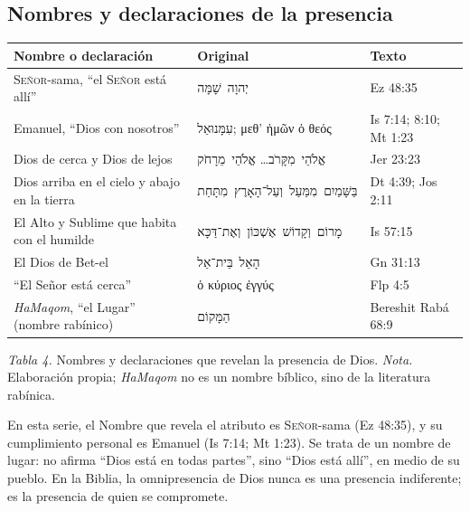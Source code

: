 \documentclass[11pt,letterpaper]{article}
\newcommand{\heb}[1]{\mbox{\foreignlanguage{hebrew}{#1}}}
\newcommand{\grc}[1]{\foreignlanguage{ancientgreek}{#1}}
\newcommand{\SENOR}{\textsc{Señor}}
\begin{document}
\subsection{Nombres y declaraciones de la presencia}

\begin{center}\small\renewcommand{\arraystretch}{1.2}
\begin{tabular}{@{}L{4.6cm}L{5.0cm}L{4.4cm}@{}}
\toprule
\textbf{Nombre o declaración} & \textbf{Original} & \textbf{Texto} \\ \midrule
\SENOR{}-sama, ``el \SENOR{} está allí'' & \heb{יְהוָה שָׁמָּה} & Ez 48:35 \\
Emanuel, ``Dios con nosotros'' & \heb{עִמָּנוּאֵל}; \grc{μεθ’ ἡμῶν ὁ θεός} & Is 7:14; 8:10; Mt 1:23 \\
Dios de cerca y Dios de lejos & \heb{אֱלֹהֵי מִקָּרֹב}\ldots{} \heb{אֱלֹהֵי מֵרָחֹק} & Jer 23:23 \\
Dios arriba en el cielo y abajo en la tierra & \heb{בַּשָּׁמַיִם מִמַּעַל וְעַל־הָאָרֶץ מִתָּחַת} & Dt 4:39; Jos 2:11 \\
El Alto y Sublime que habita con el humilde & \heb{מָרוֹם וְקָדוֹשׁ אֶשְׁכּוֹן וְאֶת־דַּכָּא} & Is 57:15 \\
El Dios de Bet-el & \heb{הָאֵל בֵּית־אֵל} & Gn 31:13 \\
``El Señor está cerca'' & \grc{ὁ κύριος ἐγγύς} & Flp 4:5 \\
\emph{HaMaqom}, ``el Lugar'' (nombre rabínico) & \heb{הַמָּקוֹם} & Bereshit Rabá 68:9 \\
\bottomrule
\end{tabular}\par
{\footnotesize\color{gris}\textit{Tabla 4.} Nombres y declaraciones que revelan la presencia de Dios. \textit{Nota.} Elaboración propia; \emph{HaMaqom} no es un nombre bíblico, sino de la literatura rabínica.}
\end{center}

\begin{nota}[Precisión]
En esta serie, el Nombre que revela el atributo es \SENOR{}-sama (Ez 48:35), y su cumplimiento personal es Emanuel (Is 7:14; Mt 1:23). Se trata de un nombre de lugar: no afirma ``Dios está en todas partes'', sino ``Dios está allí'', en medio de su pueblo. En la Biblia, la omnipresencia de Dios nunca es una presencia indiferente; es la presencia de quien se compromete.
\end{nota}

\end{document}
